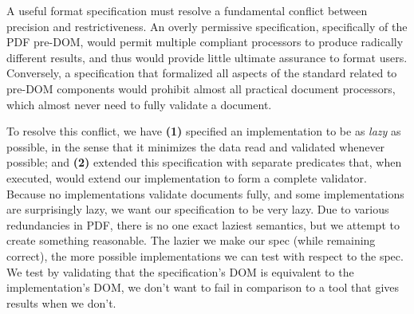 
A useful format specification must resolve a fundamental conflict between precision and restrictiveness.
%
An overly permissive specification, specifically of the PDF pre-DOM,  would permit multiple compliant processors to produce radically different results, and thus would provide little ultimate assurance to format users.
%
Conversely, a specification that formalized all aspects of the standard related to pre-DOM components would prohibit almost all practical document processors, which almost never need to fully validate a document.

To resolve this conflict, we have %
\textbf{(1)} specified an implementation to be as \emph{lazy} as possible, in the sense that it minimizes the data read and validated whenever possible; and %
\textbf{(2)} extended this specification
with separate  predicates that, when executed,
would extend our implementation to form a complete validator.
%
Because no implementations validate documents fully, and some implementations
are surprisingly lazy, we want our specification to be very lazy.
%
Due to various redundancies in PDF, there is no one exact
laziest semantics, but we attempt to create something reasonable.
%
The lazier we make our spec (while remaining correct), the more
possible implementations we can test with respect to the spec.
%
We test by validating that the specification's DOM is equivalent to the implementation's DOM,
we don't want to fail in comparison to a tool that gives results when we don't.







